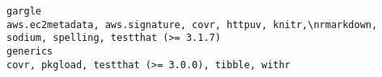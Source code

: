 \documentclass[
  letterpaper,
  DIV=11,
  numbers=noendperiod]{scrreprt}
\begin{document}
\begin{verbatim}
gargle                                                                                                                                                                                                                                                                                                                                                                                                                                                                                                                                                                                                                                                                                                                                                                                                                                                                                                                                                                                                                                                                                                                                                                                                 aws.ec2metadata, aws.signature, covr, httpuv, knitr,\nrmarkdown, sodium, spelling, testthat (>= 3.1.7)
generics                                                                                                                                                                                                                                                                                                                                                                                                                                                                                                                                                                                                                                                                                                                                                                                                                                                                                                                                                                                                                                                                                                                                                                                                                                                    covr, pkgload, testthat (>= 3.0.0), tibble, withr

\end{verbatim}
\end{document}
